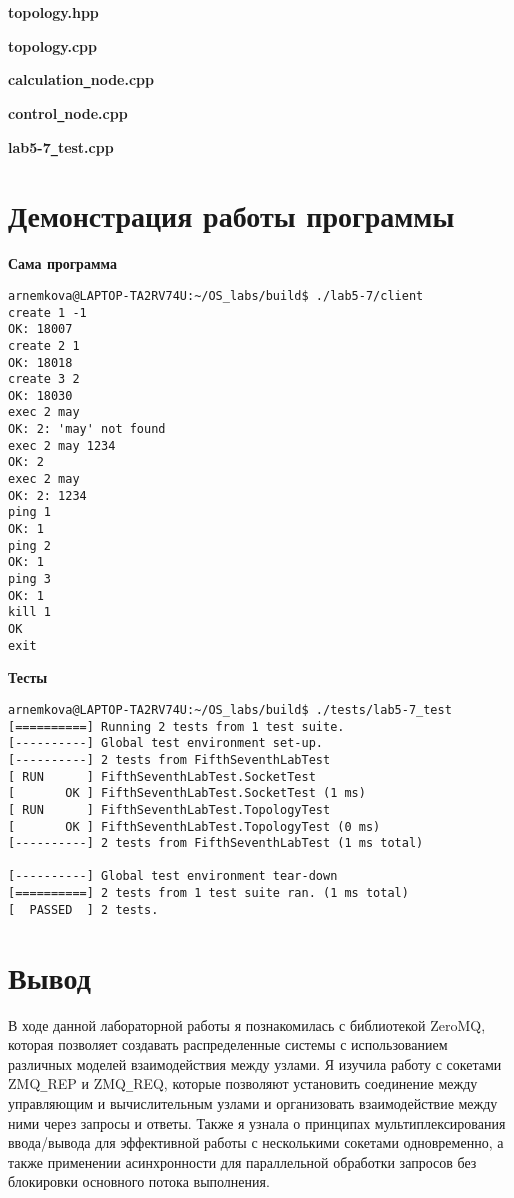 \documentclass[a4paper, 14pt]{article}
\begin{document}
\textbf{topology.hpp}


\textbf{topology.cpp}


\textbf{calculation\texttt{\_}node.cpp}


\textbf{control\texttt{\_}node.cpp}


\textbf{lab5-7\texttt{\_}test.cpp}


\section*{Демонстрация работы программы}

\textbf{Сама программа}
\begin{verbatim}
arnemkova@LAPTOP-TA2RV74U:~/OS_labs/build$ ./lab5-7/client
create 1 -1
OK: 18007
create 2 1
OK: 18018
create 3 2
OK: 18030
exec 2 may
OK: 2: 'may' not found
exec 2 may 1234
OK: 2
exec 2 may
OK: 2: 1234
ping 1
OK: 1
ping 2
OK: 1
ping 3
OK: 1
kill 1
OK
exit
\end{verbatim}

\textbf{Тесты}
\begin{verbatim}
arnemkova@LAPTOP-TA2RV74U:~/OS_labs/build$ ./tests/lab5-7_test
[==========] Running 2 tests from 1 test suite.
[----------] Global test environment set-up.
[----------] 2 tests from FifthSeventhLabTest
[ RUN      ] FifthSeventhLabTest.SocketTest
[       OK ] FifthSeventhLabTest.SocketTest (1 ms)
[ RUN      ] FifthSeventhLabTest.TopologyTest
[       OK ] FifthSeventhLabTest.TopologyTest (0 ms)
[----------] 2 tests from FifthSeventhLabTest (1 ms total)

[----------] Global test environment tear-down
[==========] 2 tests from 1 test suite ran. (1 ms total)
[  PASSED  ] 2 tests.
\end{verbatim}


\section*{Вывод}

В ходе данной лабораторной работы я познакомилась с библиотекой ZeroMQ, которая позволяет создавать распределенные системы с использованием различных моделей взаимодействия между узлами. Я изучила работу с сокетами ZMQ\texttt{\_}REP и ZMQ\texttt{\_}REQ, которые позволяют установить соединение между управляющим и вычислительным узлами и организовать взаимодействие между ними через запросы и ответы. Также я узнала о принципах мультиплексирования ввода/вывода для эффективной работы с несколькими сокетами одновременно, а также применении асинхронности для параллельной обработки запросов без блокировки основного потока выполнения.
\end{document}
